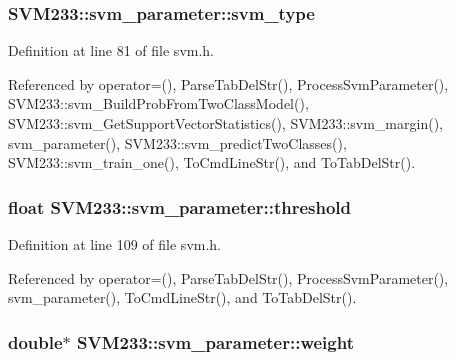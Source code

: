 \subsubsection[{\texorpdfstring{svm\+\_\+type}{svm_type}}]{ S\+V\+M233\+::svm\+\_\+parameter\+::svm\+\_\+type}\hypertarget{struct_s_v_m233_1_1svm__parameter_aa4cc55eaf546e2edb0ff62c5a5f8466e}{}\label{struct_s_v_m233_1_1svm__parameter_aa4cc55eaf546e2edb0ff62c5a5f8466e}


Definition at line 81 of file svm.\+h.



Referenced by operator=(), Parse\+Tab\+Del\+Str(), Process\+Svm\+Parameter(), S\+V\+M233\+::svm\+\_\+\+Build\+Prob\+From\+Two\+Class\+Model(), S\+V\+M233\+::svm\+\_\+\+Get\+Support\+Vector\+Statistics(), S\+V\+M233\+::svm\+\_\+margin(), svm\+\_\+parameter(), S\+V\+M233\+::svm\+\_\+predict\+Two\+Classes(), S\+V\+M233\+::svm\+\_\+train\+\_\+one(), To\+Cmd\+Line\+Str(), and To\+Tab\+Del\+Str().

\subsubsection[{\texorpdfstring{threshold}{threshold}}]{\setlength{\rightskip}{0pt plus 5cm}float S\+V\+M233\+::svm\+\_\+parameter\+::threshold}\hypertarget{struct_s_v_m233_1_1svm__parameter_a7a43eeb6067c4ae3bf32aa151f43195a}{}\label{struct_s_v_m233_1_1svm__parameter_a7a43eeb6067c4ae3bf32aa151f43195a}


Definition at line 109 of file svm.\+h.



Referenced by operator=(), Parse\+Tab\+Del\+Str(), Process\+Svm\+Parameter(), svm\+\_\+parameter(), To\+Cmd\+Line\+Str(), and To\+Tab\+Del\+Str().

\subsubsection[{\texorpdfstring{weight}{weight}}]{\setlength{\rightskip}{0pt plus 5cm}double$\ast$ S\+V\+M233\+::svm\+\_\+parameter\+::weight}\hypertarget{struct_s_v_m233_1_1svm__parameter_a99a789efdc98bdea42b30064105f87b3}{}\label{struct_s_v_m233_1_1svm__parameter_a99a789efdc98bdea42b30064105f87b3}



